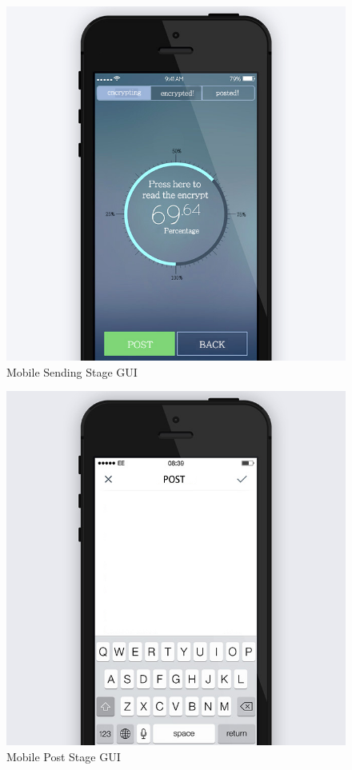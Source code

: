 \begin{figure}[h]
    \centering
    \includegraphics[width=\textwidth]{images/design/mobile_send.jpg}
    \caption{Mobile Sending Stage GUI}
    \label{fig:mobile_send}
\end{figure}

\begin{figure}[h]
    \centering
    \includegraphics[width=\textwidth]{images/design/mobile_post.jpg}
    \caption{Mobile Post Stage GUI}
    \label{fig:mobile_post}
\end{figure}

